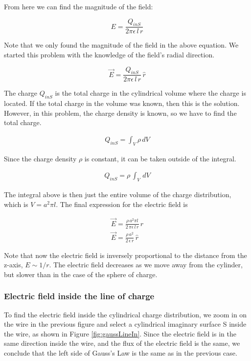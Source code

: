 \documentclass{ximera}
\begin{document}
From here we can find the magnitude of the field:


\begin{equation}
 E  = \frac{Q_{inS}}{2 \pi  \epsilon \, l\, r}
\end{equation}

Note that we only found the magnitude of the field in the above equation. We started this problem with the knowledge of the field's radial direction. 

\begin{equation}
 \vec{E}  = \frac{Q_{inS}}{2 \pi  \epsilon \, l\, r} \, \hat{r}
\end{equation}

 The charge $Q_{inS}$ is the total charge in the cylindrical volume where the charge is located. If the total charge in the volume was known, then this is the solution. However, in this problem, the charge density is known, so we have to find the total charge.

\begin{eqnarray}
Q_{inS}=\int_V \rho \, dV
\end{eqnarray}

Since the charge density $\rho$ is constant, it can be taken outside of the integral.


\begin{eqnarray}
Q_{inS}=\rho \, \int_V \, dV
\end{eqnarray}

The integral above is then just the entire volume of the charge distribution, which is $V= a^2 \pi l$. The final expression for the electric field is 


\begin{eqnarray}
 \vec{E}  = \frac{\rho \, a^2 \pi l }{2 \, \pi  \epsilon \, l \,r} \, \hat{r} \\
 \vec{E}  = \frac{\rho \,   a^2}{2 \, \epsilon \, r} \, \hat{r}
\end{eqnarray}


Note that now the electric field is inversely proportional to the distance from the z-axis, $E \sim 1/r$. The electric field decreases as we move away from the cylinder, but slower than in the case of the sphere of charge.


\subsubsection{Electric field inside the line of charge}

To find the electric field inside the cylindrical charge distribution, we zoom in on the wire in the previous figure and select a cylindrical imaginary surface S inside the wire, as shown in Figure \ref{fig:gaussLineIn}. Since the electric field is in the same direction inside the wire, and the flux of the electric field is the same, we conclude that the left side of Gauss's Law is the same as in the previous case. 
\end{document}
